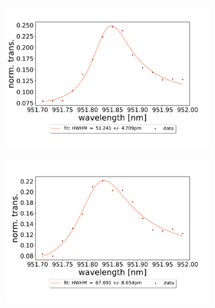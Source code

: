 \begin{figure}[h!]
\begin{subfigure}[b]{0.49\textwidth}
        \includegraphics[width=\textwidth]{figures/results/double fano fits/250um_M3:M5_fit_3.pdf}
        \caption{}
        \label{fig:250um_M3:M5_fit_3}
    \end{subfigure}
    \begin{subfigure}[b]{0.49\textwidth}
        \includegraphics[width=\textwidth]{figures/results/double fano fits/250um_M3:M5_fit_4.pdf}
        \caption{}
        \label{fig:250um_M3:M5_fit_4}
    \end{subfigure}
    \begin{subfigure}[b]{0.49\textwidth}

\end{subfigure}
\end{figure}
